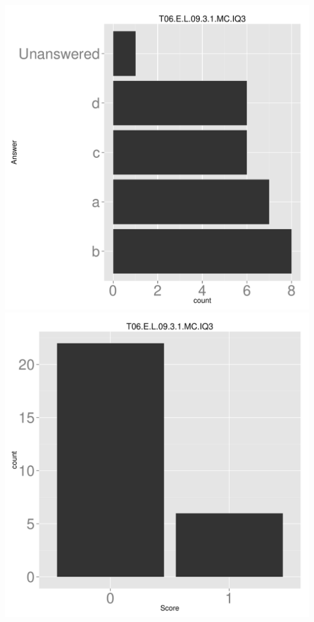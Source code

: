 \documentclass[12pt,nohyper]{tufte-handout}\usepackage[]{graphicx}\usepackage[]{color}
\begin{document}
\begin{center} \includegraphics[width=.45\linewidth]{Topic06_44_answer} \includegraphics[width=.45\linewidth]{Topic06_44_score} \end{center} 
\end{document}
